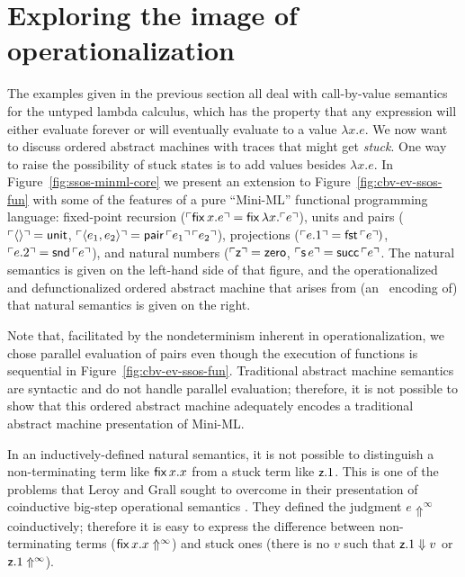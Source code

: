 \section{Exploring the image of operationalization}
\label{sec:absmachine-nondeterminism}

The examples given in the previous section all deal
with call-by-value semantics for the untyped lambda calculus, which
has the property that any expression will either evaluate forever or
will eventually evaluate to a value $\lambda x. e$. We now want to
discuss ordered abstract machines with traces
that might get {\it stuck}. One way to raise the possibility of stuck
states is to add values besides $\lambda x.e$. In
Figure~\ref{fig:ssos-minml-core} we present an extension to
Figure~\ref{fig:cbv-ev-ssos-fun} with some of the features of a pure
``Mini-ML'' functional programming language: fixed-point recursion
(${\ulcorner{{\sf fix}\,x.e}\urcorner} = {\sf fix}\,\lambda x.{\ulcorner{e}\urcorner}$),
units and pairs (${\ulcorner{\langle\rangle}\urcorner} = {\sf unit}$,
${\ulcorner{\langle e_1, e_2 \rangle}\urcorner} = {\sf
  pair}\,{\ulcorner{e_1}\urcorner}\,{\ulcorner{e_2}\urcorner}$), projections (${\ulcorner{e.1}\urcorner} =
{\sf fst}\,{\ulcorner{e}\urcorner})$, ${\ulcorner{e.2}\urcorner} = {\sf snd}\,{\ulcorner{e}\urcorner}$), and
natural numbers (${\ulcorner{{\sf z}}\urcorner} = {\sf zero}$, ${\ulcorner{{\sf s}\,e}\urcorner}
= {\sf succ}\,{\ulcorner{e}\urcorner}$.  The natural semantics is given on the
left-hand side of that figure, and the operationalized and
defunctionalized ordered abstract machine that arises from (an
\sls~encoding of) that natural semantics is given on the right.


Note that, facilitated by the nondeterminism inherent in
operationalization, we chose parallel evaluation of pairs even though
the execution of functions is sequential in
Figure~\ref{fig:cbv-ev-ssos-fun}.  Traditional abstract machine
semantics are syntactic and do not handle parallel evaluation;
therefore, it is not possible to show that this ordered abstract
machine adequately encodes a traditional abstract machine presentation
of Mini-ML.

In an inductively-defined natural semantics, it is not possible to
distinguish a non-terminating term like ${\sf fix}\,x.x$ from a stuck
term like ${\sf z}.1$.  This is one of the problems that Leroy and
Grall sought to overcome in their presentation of coinductive big-step
operational semantics \cite{leroy09coinductive}. They defined the
judgment $e \Uparrow^\infty$ coinductively; therefore it is easy to
express the difference between non-terminating terms
(${\sf fix}\,x.x \Uparrow^\infty$) and stuck ones
(there is no $v$ such that ${\sf z}.1 \Downarrow v$ or
${\sf z}.1 \Uparrow^\infty$).

